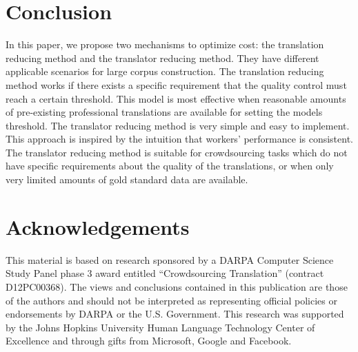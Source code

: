 \documentclass[11pt,letterpaper]{article}
\begin{document}
\section{Conclusion}
In this paper, we propose two mechanisms to optimize cost: the translation reducing method and the translator reducing method. They have different applicable scenarios for large corpus construction.
The translation reducing method works if there exists a specific requirement that the quality control must reach a certain threshold. 
This model is most effective when reasonable amounts of pre-existing professional translations are available for setting the models threshold. 
The translator reducing method is very simple and easy to implement. This approach is inspired by the intuition that workers' performance is consistent. The translator reducing method is suitable for crowdsourcing tasks which do not have specific requirements about the quality of the translations, 
or when only very limited amounts of gold standard data are available.

\section*{Acknowledgements}

This material is based on research sponsored by a DARPA Computer Science Study Panel phase 3 award entitled ``Crowdsourcing Translation'' (contract D12PC00368). The views and conclusions contained in this publication are those of the authors and should not be interpreted as representing official policies or endorsements by DARPA or the U.S. Government. This research was supported by the Johns Hopkins University Human Language Technology Center of Excellence and through gifts from Microsoft, Google and Facebook.

 

\end{document}
